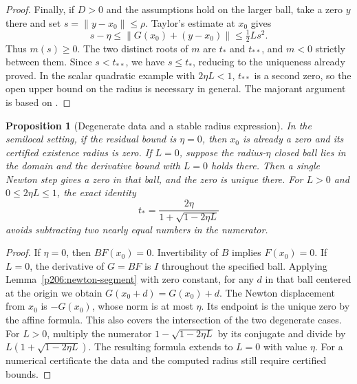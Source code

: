 \documentclass[11pt,oneside,openany]{book}
\theoremstyle{plain}
\newtheorem{proposition}[theorem]{Proposition}
\theoremstyle{definition}
\theoremstyle{remark}
\begin{document}
\begin{proof}
Finally, if \(D>0\) and the assumptions hold on the larger ball,
take a zero \(y\) there and set \(s=\|y-x_0\|\le\rho\).
Taylor's estimate at \(x_0\) gives
\[
 s-\eta\le\|G(x_0)+(y-x_0)\|\le\tfrac12 Ls^2 .
\]
Thus \(m(s)\ge0\). The two distinct roots of \(m\) are \(t_*\) and
\(t_{**}\), and \(m<0\) strictly between them. Since \(s<t_{**}\),
we have \(s\le t_*\), reducing to the uniqueness already proved.
In the scalar quadratic example with \(2\eta L<1\), \(t_{**}\)
is a second zero, so the open upper bound on the radius is
necessary in general. The majorant argument is based on
\cite[Theorem~1 and Corollaries~10--12]{ferreira}.
\end{proof}

\begin{proposition}[Degenerate data and a stable radius expression]\label{p206:W78}
In the semilocal setting, if the residual bound is \(\eta=0\),
then \(x_0\) is already a zero and its certified existence
radius is zero. If \(L=0\), suppose the radius-\(\eta\) closed
ball lies in the domain and the derivative bound with \(L=0\)
holds there. Then a single Newton step gives a zero in that
ball, and the zero is unique there. For \(L>0\) and
\(0\le 2\eta L\le1\), the exact identity
\[
 t_*=\frac{2\eta}{1+\sqrt{1-2\eta L}}
\]
avoids subtracting two nearly equal numbers in the numerator.
\end{proposition}
\begin{proof}
If \(\eta=0\), then \(BF(x_0)=0\). Invertibility of \(B\) implies
\(F(x_0)=0\). If \(L=0\), the derivative of \(G=BF\) is \(I\)
throughout the specified ball. Applying
Lemma~\ref{p206:newton-segment} with zero constant, for any
\(d\) in that ball centered at the origin we obtain
\(G(x_0+d)=G(x_0)+d\). The Newton displacement from \(x_0\) is
\(-G(x_0)\), whose norm is at most \(\eta\). Its endpoint is the
unique zero by the affine formula. This also covers the
intersection of the two degenerate cases. For \(L>0\), multiply
the numerator \(1-\sqrt{1-2\eta L}\) by its conjugate and divide
by \(L(1+\sqrt{1-2\eta L})\). The resulting formula extends to
\(L=0\) with value \(\eta\). For a numerical certificate the
data and the computed radius still require certified bounds.
\end{proof}
\end{document}
